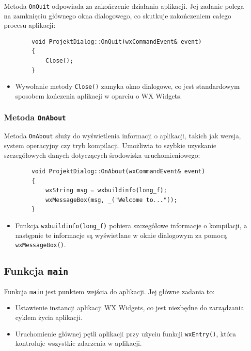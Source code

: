 \documentclass[]{article}
\begin{document}
Metoda \texttt{OnQuit} odpowiada za zakończenie działania aplikacji. Jej zadanie polega na zamknięciu głównego okna dialogowego, co skutkuje zakończeniem całego procesu aplikacji:

	
	\begin{verbatim}
		void ProjektDialog::OnQuit(wxCommandEvent& event)
		{
			Close();
		}
	\end{verbatim}
	\begin{itemize}
	\item Wywołanie metody \texttt{Close()} zamyka okno dialogowe, co jest standardowym sposobem kończenia aplikacji w oparciu o WX Widgets.
\end{itemize}
	
	\subsubsection{Metoda \texttt{OnAbout}}
	
Metoda \texttt{OnAbout} służy do wyświetlenia informacji o aplikacji, takich jak wersja, system operacyjny czy tryb kompilacji. Umożliwia to szybkie uzyskanie szczegółowych danych dotyczących środowiska uruchomieniowego:

	
	\begin{verbatim}
		void ProjektDialog::OnAbout(wxCommandEvent& event)
		{
			wxString msg = wxbuildinfo(long_f);
			wxMessageBox(msg, _("Welcome to..."));
		}
	\end{verbatim}
	\begin{itemize}
		\item Funkcja \texttt{wxbuildinfo(long\_f)} pobiera szczegółowe informacje o kompilacji, a następnie te informacje są wyświetlane w oknie dialogowym za pomocą \texttt{wxMessageBox()}.
	\end{itemize}
	
		\subsection{Funkcja \texttt{main}}
	
	Funkcja \texttt{main} jest punktem wejścia do aplikacji. Jej główne zadania to:
	\begin{itemize}
		\item Ustawienie instancji aplikacji WX Widgets, co jest niezbędne do zarządzania cyklem życia aplikacji.
		\item Uruchomienie głównej pętli aplikacji przy użyciu funkcji \texttt{wxEntry()}, która kontroluje wszystkie zdarzenia w aplikacji.
	\end{itemize}
	
\end{document}
